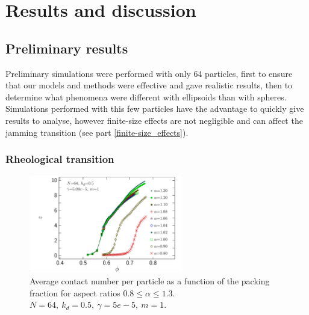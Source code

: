 \documentclass[class=report, float=false, crop=false]{standalone}
\begin{document}
\chapter{Results and discussion}
\label{chap:results}

\section{Preliminary results}

Preliminary simulations were performed with only 64 particles, first to ensure that our models and methods were effective and gave realistic results, then to determine what phenomena were different with ellipsoids than with spheres. Simulations performed with this few particles have the advantage to quickly give results to analyse, however finite-size effects are not negligible and can affect the jamming transition (see part \ref{finite-size_effects}).

\subsection{Rheological transition}
\label{preliminary_rheological_transition}

\begin{figure}[h!]
\centering
\includegraphics[width=0.6\textwidth]{figures/figs/z_phi_0064_KDk500_Ml100_GDg500}
\caption{Average contact number per particle as a function of the packing fraction for aspect ratios $0.8\le\alpha\le1.3$. $N=64,~ k_d=0.5,~ \dot{\gamma}=5e-5,~ m=1$.}
\label{z_phi_0064_KDk500_Ml100_GDg500}
\end{figure}
\end{document}

